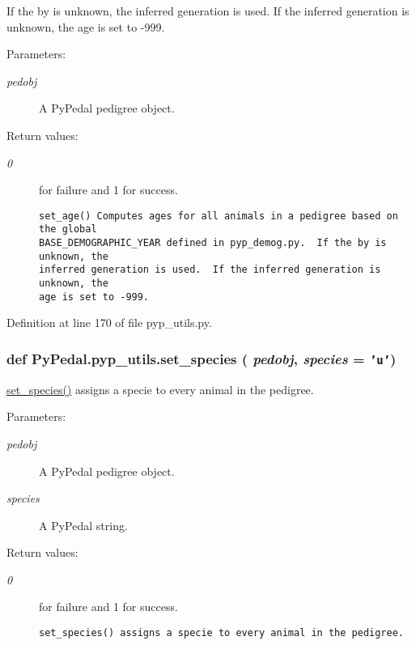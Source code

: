 If the by is unknown, the inferred generation is used. If the inferred generation is unknown, the age is set to -999. \begin{Desc}
\item[Parameters:]
\begin{description}
\item[{\em pedobj}]A Py\-Pedal pedigree object. \end{description}
\end{Desc}
\begin{Desc}
\item[Return values:]
\begin{description}
\item[{\em 0}]for failure and 1 for success.

\footnotesize\begin{verbatim}set_age() Computes ages for all animals in a pedigree based on the global
BASE_DEMOGRAPHIC_YEAR defined in pyp_demog.py.  If the by is unknown, the
inferred generation is used.  If the inferred generation is unknown, the
age is set to -999.
\end{verbatim}
\normalsize
 \end{description}
\end{Desc}


Definition at line 170 of file pyp\_\-utils.py.\hypertarget{namespacePyPedal_1_1pyp__utils_d2010f93ea63cd90f24b683c2ed0eb73}{
\subsubsection[set\_\-species]{\setlength{\rightskip}{0pt plus 5cm}def Py\-Pedal.pyp\_\-utils.set\_\-species ( {\em pedobj},  {\em species} = {\tt 'u'})}}
\label{namespacePyPedal_1_1pyp__utils_d2010f93ea63cd90f24b683c2ed0eb73}


\hyperlink{namespacePyPedal_1_1pyp__utils_d2010f93ea63cd90f24b683c2ed0eb73}{set\_\-species()} assigns a specie to every animal in the pedigree. 

\begin{Desc}
\item[Parameters:]
\begin{description}
\item[{\em pedobj}]A Py\-Pedal pedigree object. \item[{\em species}]A Py\-Pedal string. \end{description}
\end{Desc}
\begin{Desc}
\item[Return values:]
\begin{description}
\item[{\em 0}]for failure and 1 for success.

\footnotesize\begin{verbatim}set_species() assigns a specie to every animal in the pedigree.
\end{verbatim}
\normalsize
 \end{description}
\end{Desc}


